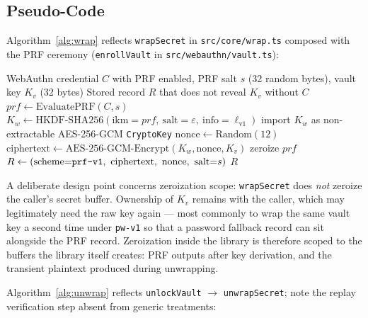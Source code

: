 \documentclass[runningheads]{llncs}
\begin{document}
\subsection{Pseudo-Code}
Algorithm~\ref{alg:wrap} reflects \texttt{wrapSecret} in \texttt{src/core/wrap.ts} composed with the PRF ceremony (\texttt{enrollVault} in \texttt{src/webauthn/vault.ts}):

\begin{algorithm}[h]
  \caption{Vault key wrapping (\texttt{enrollVault} $\to$ \texttt{wrapSecret}, scheme \texttt{prf-v1})}
  \label{alg:wrap}
  \begin{algorithmic}[1]
    \Require WebAuthn credential $C$ with PRF enabled, PRF salt $s$ (32 random bytes), vault key $K_v$ (32 bytes)
    \Ensure Stored record $R$ that does not reveal $K_v$ without $C$
    \State $prf \gets \mathrm{EvaluatePRF}(C, s)$ 
    \State $K_w \gets \mathrm{HKDF\text{-}SHA256}(\mathrm{ikm}{=}prf,\ \mathrm{salt}{=}\varepsilon,\ \mathrm{info}{=}\ell_{\mathrm{v1}})$
    \State import $K_w$ as non-extractable AES-256-GCM \texttt{CryptoKey}
    \State $\mathrm{nonce} \gets \mathrm{Random}(12)$
    \State $\mathrm{ciphertext} \gets \mathrm{AES\text{-}256\text{-}GCM\text{-}Encrypt}(K_w, \mathrm{nonce}, K_v)$ 
    \State zeroize $prf$ 
    \State $R \gets (\mathrm{scheme}{=}\text{\texttt{prf-v1}},\ \mathrm{ciphertext},\ \mathrm{nonce},\ \mathrm{salt}{=}s)$
    \State \Return $R$
  \end{algorithmic}
\end{algorithm}

A deliberate design point concerns zeroization scope: \texttt{wrapSecret} does \emph{not} zeroize the caller's secret buffer.
Ownership of $K_v$ remains with the caller, which may legitimately need the raw key again --- most commonly to wrap the same vault key a second time under \texttt{pw-v1} so that a password fallback record can sit alongside the PRF record.
Zeroization inside the library is therefore scoped to the buffers the library itself creates: PRF outputs after key derivation, and the transient plaintext produced during unwrapping.

Algorithm~\ref{alg:unwrap} reflects \texttt{unlockVault} $\to$ \texttt{unwrapSecret}; note the replay verification step absent from generic treatments:
\end{document}

